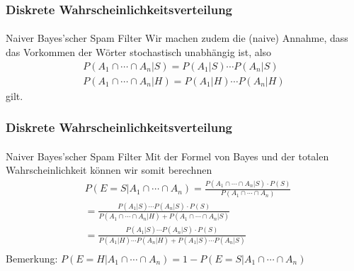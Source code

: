 \documentclass{beamer}
\begin{document}
\begin{frame}
    \frametitle{Diskrete Wahrscheinlichkeitsverteilung}
\framesubtitle{}

\begin{block}{Naiver Bayes'scher Spam Filter}
 Wir machen zudem die (naive) Annahme, dass das Vorkommen der Wörter  stochastisch unabhängig ist, also 
\begin{align*}
P(A_1 \cap \cdots \cap A_n | S) = P(A_1 | S) \cdots P(A_n | S) \\
P(A_1 \cap \cdots \cap A_n | H) = P(A_1 | H) \cdots P(A_n | H)
\end{align*}
gilt.
\end{block}

 \end{frame}


\begin{frame}
    \frametitle{Diskrete Wahrscheinlichkeitsverteilung}
\framesubtitle{}

\begin{block}{Naiver Bayes'scher Spam Filter}
Mit der Formel von Bayes und der totalen Wahrscheinlichkeit  können wir somit berechnen
\begin{align*}
& P(E=S |  A_1 \cap \cdots \cap A_n) = \frac{P(A_1 \cap \cdots \cap A_n | S) \cdot P(S)}{P(A_1 \cap \cdots \cap A_n)} \\
&=  \frac{P(A_1 | S) \cdots P(A_n | S) \cdot P(S)}{P(A_1 \cap \cdots \cap A_n | H) + P(A_1 \cap \cdots \cap A_n | S)} \\
&=  \frac{P(A_1 | S) \cdots P(A_n | S) \cdot P(S)}{P(A_1 | H) \cdots P(A_n | H)  + P(A_1 | S) \cdots P(A_n | S) } \\
\end{align*}
Bemerkung: $P(E=H |  A_1 \cap \cdots \cap A_n) = 1- P(E=S |  A_1 \cap \cdots \cap A_n) $
\end{block}



 \end{frame}
\end{document}
